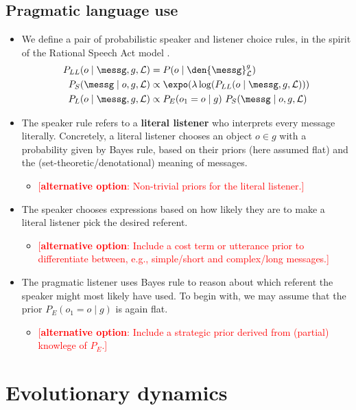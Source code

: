 \documentclass[fleqn,reqno,12pt]{article}
\newcommand{\optional}[1]{\textcolor{Red}{[\textbf{alternative option}: #1]}}
\begin{document}
\subsection{Pragmatic language use}
\label{sec:pragm-lang-use}

\begin{itemize}
\item We define a pair of probabilistic speaker and listener choice rules, in the spirit of the
  Rational Speech Act model
  \citep{FrankGoodman2012:Predicting-Prag,FrankeJager2015:Probabilistic-p,GoodmanFrank2016:Pragmatic-Langu}. 
  \begin{align*}
    P_{LL}(o \mid \messg, g, \mathcal{L}) & = P(o \mid \den{\messg}_{\mathcal{L}}^g) \\
    P_{S}(\messg \mid o, g, \mathcal{L}) & \propto \expo(\lambda \log(P_{LL}(o \mid \messg, g,
    \mathcal{L}))) \\
    P_{L}(o \mid \messg, g, \mathcal{L}) & \propto P_E(o_1 = o \mid g) \ P_{S}(\messg \mid o, g, \mathcal{L})
  \end{align*}

\item The speaker rule refers to a \textbf{literal listener} who interprets every message
  literally. Concretely, a literal listener chooses an object $o \in g$ with a probability
  given by Bayes rule, based on their priors (here assumed flat) and the
  (set-theoretic/denotational) meaning of messages.
  \begin{itemize}
  \item \optional{Non-trivial priors for the literal listener.}
  \end{itemize}
\item The speaker chooses expressions based on how likely they are to make a literal
  listener pick the desired referent.
  \begin{itemize}
  \item \optional{Include a cost term or utterance prior to differentiate between, e.g.,
      simple/short and complex/long messages.}
  \end{itemize}
\item The pragmatic listener uses Bayes rule to reason about which referent the speaker might
  most likely have used. To begin with, we may assume that the prior $P_E(o_1 = o \mid g)$ is
  again flat.
  \begin{itemize}
  \item \optional{Include a strategic prior derived from (partial) knowlege of $P_E$.}
  \end{itemize}

\end{itemize}


\section{Evolutionary dynamics}
\label{sec:evol-dynam}



\printbibliography[heading=bibintoc]
\end{document}
